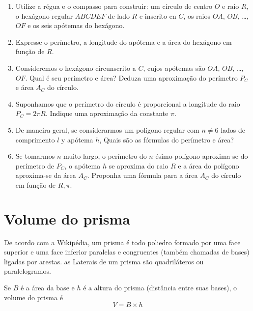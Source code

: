 \begin{enumerate}
\item Utilize a régua e o compasso para construir: um círculo de centro $O$
  e raio $R$, o hexágono regular $ABCDEF$ de lado $R$ e inscrito en $C$,
  os raios ${OA}$, ${OB}$, \ldots, ${OF}$ e os seis apótemas do hexágono.
\item Expresse o perímetro, a longitude do apótema
   e a área do hexágono em função de $R$.
\item Consideremos o hexágono circunscrito a $C$, cujos apótemas
  são ${OA}$, ${OB}$, \ldots, ${OF}$. Qual é seu perímetro e
  área? Deduza uma aproximação do perímetro $P_C$ e área $A_C$ do círculo.
\item Suponhamos que o perímetro do círculo é proporcional a longitude do raio
  $P_C = 2 \pi R$. Indique uma aproximação da constante $\pi$.
\item De maneira geral, se considerarmos um polígono regular com $n \neq 6$
  lados de comprimento $l$ y apótema $h$, Quais são as fórmulas do perímetro e área?
\item Se tomarmos $n$ muito largo, o perímetro do $n$-ésimo polígono aproxima-se
  do perímetro de $P_C$, o apótema $h$ se aproxima do raio $R$ e
  a área do polígono aproxima-se da área $A_C$.
  Proponha uma fórmula para a área $A_C$ do círculo em função de $R,\pi$.
\end{enumerate}

\section{Volume do prisma}

De acordo com a Wikipédia, um prisma é todo poliedro formado por uma face
superior e uma face inferior paralelas e congruentes (também chamadas de bases)
ligadas por arestas. as Laterais de um prisma são quadriláteros ou paralelogramos.

\begin{center}
\end{center}

Se $B$ é a área da base e $h$ é a altura do prisma (distância entre suas bases),
o volume do prisma é $$V = B \times h$$

